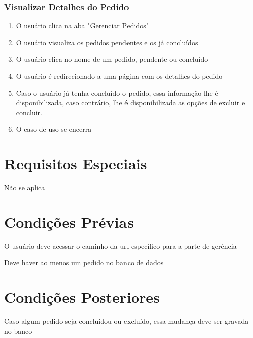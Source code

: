 \subsubsection{Visualizar Detalhes do Pedido}
\begin{enumerate}
	\item O usuário clica na aba "Gerenciar Pedidos"
	\item O usuário visualiza os pedidos pendentes e os já concluídos
	\item O usuário clica no nome de um pedido, pendente ou concluído
	\item O usuário é redirecionado a uma página com os detalhes do pedido
	\item Caso o usuário já tenha concluído o pedido, essa informação lhe é disponibilizada, caso contrário, lhe é disponibilizada as opções de excluir e concluir.
	\item O caso de uso se encerra
\end{enumerate}

\section{Requisitos Especiais}

Não se aplica

\section{Condições Prévias}

O usuário deve acessar o caminho da url específico para a parte de gerência

Deve haver ao menos um pedido no banco de dados

\section{Condições Posteriores}

Caso algum pedido seja concluídou ou excluído, essa mudança deve ser gravada no banco